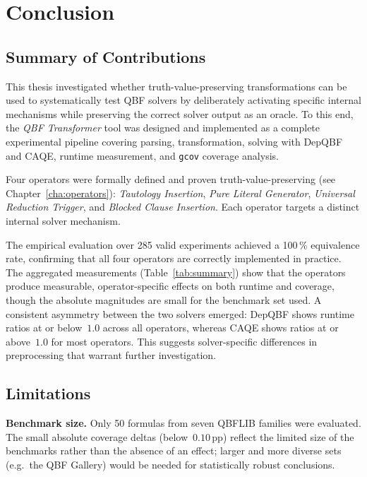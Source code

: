 \chapter{Conclusion}\label{cha:conclusion}

\section{Summary of Contributions}\label{sec:summary}

This thesis investigated whether truth-value-preserving
transformations can be used to systematically test QBF solvers by
deliberately activating specific internal mechanisms while
preserving the correct solver output as an oracle. To this end, the
\emph{QBF Transformer} tool was designed and implemented as a
complete experimental pipeline covering parsing, transformation,
solving with DepQBF and CAQE, runtime measurement, and \texttt{gcov}
coverage analysis.

Four operators were formally defined and proven truth-value-preserving
(see Chapter~\ref{cha:operators}): \emph{Tautology Insertion},
\emph{Pure Literal Generator}, \emph{Universal Reduction Trigger},
and \emph{Blocked Clause Insertion}. Each operator targets a
distinct internal solver mechanism.

The empirical evaluation over 285 valid experiments achieved a
100\,\% equivalence rate, confirming that all four operators are
correctly implemented in practice. The aggregated measurements
(Table~\ref{tab:summary}) show that the operators produce
measurable, operator-specific effects on both runtime and coverage,
though the absolute magnitudes are small for the benchmark set
used. A consistent asymmetry between the two solvers emerged:
DepQBF shows runtime ratios at or below~$1.0$ across all operators,
whereas CAQE shows ratios at or above~$1.0$ for most operators.
This suggests solver-specific differences in preprocessing that
warrant further investigation.

\section{Limitations}\label{sec:limitations}

\textbf{Benchmark size.} Only 50 formulas from seven QBFLIB
families were evaluated. The small absolute coverage deltas
(below~$0.10\,\text{pp}$) reflect the limited size of the
benchmarks rather than the absence of an effect; larger and more
diverse sets (e.g.\ the QBF Gallery) would be needed for
statistically robust conclusions.

